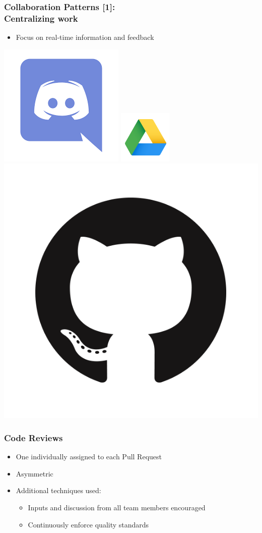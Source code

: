\documentclass{beamer}
\begin{document}
\begin{frame}
\frametitle{Collaboration Patterns [1]: \\ Centralizing work}
\begin{itemize}
 \item Focus on real-time information and feedback
\end{itemize}
\begin{minipage}{1\textwidth}
  \centering
  \includegraphics[width=.2\linewidth]{Discord}
  \includegraphics[width=.2\linewidth]{GoogleDrive}
  \includegraphics[width=.2\linewidth]{GitHub}\footnotemark
\end{minipage}
\end{frame}


\begin{frame}
\frametitle{Code Reviews}
 \begin{itemize}
  \item One individually assigned to each Pull Request
  \item Asymmetric
  \item Additional techniques used:
   \begin{itemize}
    \item Inputs and discussion from all team members encouraged
    \item Continuously enforce quality standards
   \end{itemize}
\end{itemize}
\end{frame}
\end{document}
